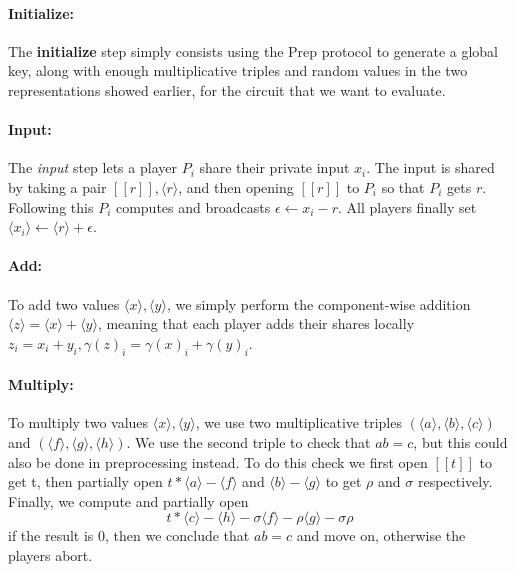 \documentclass[../main.tex]{subfiles}
\begin{document}
\paragraph{Initialize:} The \textbf{initialize} step simply consists using the Prep protocol to generate a global key, along with enough multiplicative triples and random values in the two representations showed earlier, for the circuit that we want to evaluate.

\paragraph{Input:} The \textit{input} step lets a player $P_i$ share their private input $x_i$. The input is shared by taking a pair $[\![ r ]\!], \langle r \rangle$, and then opening $[\![ r ]\!]$ to $P_i$ so that $P_i$ gets $r$. Following this $P_i$ computes and broadcasts $\epsilon \leftarrow x_i - r$. All players finally set $\langle x_i \rangle \leftarrow \langle r \rangle + \epsilon$. %

\paragraph{Add:} To add two values $\langle x \rangle, \langle y \rangle$, we simply perform the component-wise addition $\langle z \rangle = \langle x \rangle + \langle y \rangle$, meaning that each player adds their shares locally $z_i = x_i + y_i, \gamma(z)_i = \gamma(x)_i + \gamma(y)_i$. %

\paragraph{Multiply:} To multiply two values $\langle x \rangle, \langle y \rangle$, we use two multiplicative triples $(\langle a \rangle, \langle b \rangle, \langle c \rangle)$ and $(\langle f \rangle, \langle g \rangle, \langle h \rangle)$. We use the second triple to check that $ab = c$, but this could also be done in preprocessing instead. To do this check we first open $[\![ t ]\!]$ to get t, then partially open $t * \langle a \rangle - \langle f \rangle$ and $\langle b \rangle - \langle g \rangle$ to get $\rho$ and $\sigma$ respectively. Finally, we compute and partially open $$t * \langle c \rangle - \langle h \rangle - \sigma \langle f \rangle - \rho \langle g \rangle - \sigma \rho$$
if the result is $0$, then we conclude that $ab = c$ and move on, otherwise the players abort.
\end{document}
